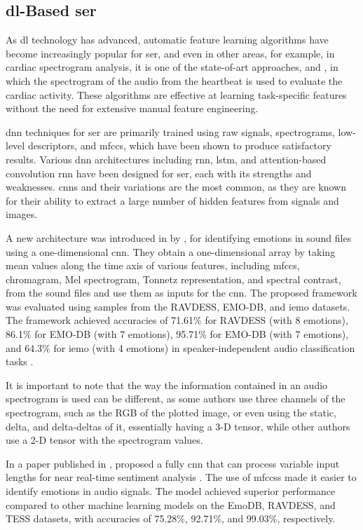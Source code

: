\subsection{\acl{dl}-Based \ac{ser}}

As \ac{dl} technology has advanced, automatic feature learning algorithms have become increasingly popular for \ac{ser}, and even in other areas, for example, in cardiac spectrogram analysis, it is one of the state-of-art approaches, \cite{8759878} and \cite{Zhou2022}, in which the spectrogram of the audio from the heartbeat is used to evaluate the cardiac activity. These algorithms are effective at learning task-specific features without the need for extensive manual feature engineering.

\ac{dnn} techniques for \ac{ser} are primarily trained using raw signals, spectrograms, low-level descriptors, and \ac{mfccs}, which have been shown to produce satisfactory results. Various \ac{dnn} architectures including \ac{rnn}, \ac{lstm}, and attention-based convolution \ac{rnn} have been designed for \ac{ser}, each with its strengths and weaknesses. \acp{cnn} and their variations are the most common, as they are known for their ability to extract a large number of hidden features from signals and images.

A new architecture was introduced in \citeyear{Issa2020} by \citeauthor{Issa2020}, for identifying emotions in sound files using a one-dimensional \ac{cnn}. They obtain a one-dimensional array by taking mean values along the time axis of various features, including \ac{mfccs}, chromagram, Mel spectrogram, Tonnetz representation, and spectral contrast, from the sound files and use them as inputs for the \ac{cnn}. The proposed framework was evaluated using samples from the RAVDESS, EMO-DB, and \ac{iemo} datasets. The framework achieved accuracies of 71.61\% for RAVDESS (with 8 emotions), 86.1\% for EMO-DB (with 7 emotions), 95.71\% for EMO-DB (with 7 emotions), and 64.3\% for \ac{iemo} (with 4 emotions) in speaker-independent audio classification tasks \cite{Issa2020}.

It is important to note that the way the information contained in an audio spectrogram is used can be different, as some authors use three channels of the spectrogram, such as the RGB of the plotted image, or even using the static, delta, and delta-deltas of it, essentially having a 3-D tensor, while other authors use a 2-D tensor with the spectrogram values.

In a paper published in \citeyear{GARCIAORDAS2021102946}, \citeauthor{GARCIAORDAS2021102946} proposed a fully \ac{cnn} that can process variable input lengths for near real-time sentiment analysis \cite{GARCIAORDAS2021102946}. The use of \acp{mfccs} made it easier to identify emotions in audio signals. The model achieved superior performance compared to other machine learning models on the EmoDB, RAVDESS, and TESS datasets, with accuracies of 75.28\%, 92.71\%, and 99.03\%, respectively.

